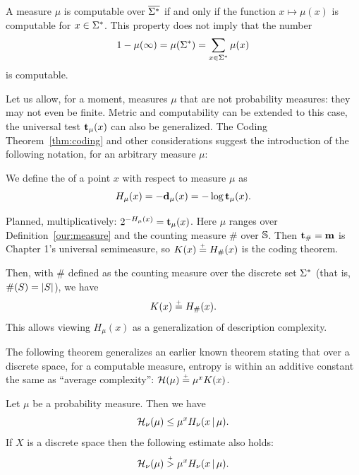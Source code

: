  \begin{remark}
  \label{rem:g4.5.3}
A measure $\mu$ is computable over $\overline{\Sigma^{*}}$ if and only if the
function $x \mapsto \mu(x)$ is computable for $x \in \Sigma^{*}$.
This property does not imply that the number
 \[
 1 - \mu(\infty) = \mu(\Sigma^{*}) = \sum_{x\in\Sigma^{*}} \mu(x)
 \]
 is computable.
 \end{remark}

Let us allow, for a moment, measures $\mu$ that are not probability
measures: they may not even be finite.
Metric and computability can be extended to this case, the universal test
$\mathbf{t}_{\mu}(x)$ can also be generalized.
The Coding Theorem~\ref{thm:coding}
and other considerations suggest the introduction of
the following notation, for an arbitrary measure $\mu$:

 \begin{definition}
  \label{def:g4.5.4}
We define the  of a point $x$ with respect to measure
$\mu$ as
 \begin{equation}\label{eq:alg-ent}
   H_{\mu}(x) = -\mathbf{d}_{\mu}(x) = -\log\mathbf{t}_{\mu}(x).
 \end{equation}
 \end{definition}

\begin{formalization}
Planned, multiplicatively: $2^{-H_{\mu}(x)} = \mathbf{t}_{\mu}(x)$. Here $\mu$ ranges over
Definition~\ref{our:measure} and the counting measure $\#$ over $\mathbb{S}$. Then $\mathbf{t}_{\#} = \mathbf{m}$ is
Chapter 1's universal semimeasure, so $K(x)\stackrel{{}_+}{=} H_{\#}(x)$ is the coding theorem.
\end{formalization}
Then, with $\#$ defined as the counting measure over the discrete set
$\Sigma^{*}$ (that is, $\#(S) = |S|$), we have
 \[
   K(x) \stackrel{{}_+}{=} H_{\#}(x).
 \]
This allows viewing $H_{\mu}(x)$ as a generalization of description
complexity.

The following theorem generalizes an earlier known theorem stating that
over a discrete space, for a computable measure,
entropy is within an additive constant the same as ``average complexity'':
$\mathcal{H}(\mu) \stackrel{{}_+}{=} \mu^{x} K(x)$.

 \begin{theorem}
  \label{thm:g4.5.1}
Let $\mu$ be a probability measure.
Then we have
 \begin{equation}\label{eq:entropy-less-avg-algentr}
  \mathcal{H}_{\nu}(\mu) \le \mu^{x} H_{\nu}(x \,\vert\, \mu).
 \end{equation}
If $X$ is a discrete space then the following estimate also holds:
  \begin{equation}\label{eq:entropy-gea-avg-algentr}
  \mathcal{H}_{\nu}(\mu) \stackrel{{}_+}{>} \mu^{x} H_{\nu}(x \,\vert\, \mu).
  \end{equation}
 \end{theorem}

